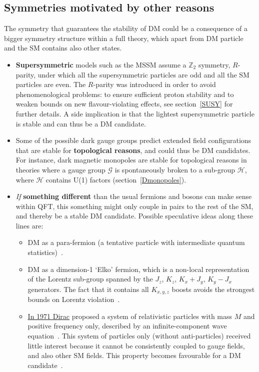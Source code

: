 \subsection{Symmetries motivated by other reasons} \label{sec:explicit:stabiilty}
The symmetry that guarantees the stability of DM could be a consequence of a bigger symmetry structure
within a full theory, which apart from DM particle and the SM contains also other states. 
 \begin{itemize}
 \item[$\blacktriangleright$] {\bf Supersymmetric} models such as the MSSM assume a  $\mathbb{Z}_2$  symmetry, $R$-parity,
 under which all the supersymmetric particles are odd and all the SM particles are even. The $R$-parity was introduced in order
 to avoid phenomenological problems: 
 to ensure sufficient proton stability and to weaken bounds on new flavour-violating effects,
 see section~\ref{SUSY} for further details. 
A side implication is that the lightest supersymmetric particle is stable and can thus be a DM candidate. 

 \item[$\blacktriangleright$] 
Some of the possible dark gauge groups predict extended field configurations that are stable for {\bf topological reasons}, 
and could thus be DM candidates. For instance, dark magnetic monopoles are stable for topological reasons in theories
where a gauge group $\mathcal{G}$ is spontaneously broken to a sub-group $\mathcal{H}$,  where
$\mathcal{H}$ contains U(1) factors (section~\ref{Dmonopoles}).


\item[$\blacktriangleright$] {\em If} {\bf something different} than the usual fermions and bosons can make sense within QFT, 
this something might only couple in pairs to the rest of the SM, and thereby be a stable DM candidate.
Possible speculative ideas along these lines are: 
\begin{itemize}
\item[$\rhd$] DM as a para-fermion (a tentative particle with intermediate quantum statistics)~\cite{1807.07289}.
\item[$\rhd$] DM as a dimension-1 `{Elko}' fermion, which is a non-local representation of the Lorentz sub-group spanned by the
$J_z$, $K_z$, $K_x+J_y$, $K_y-J_x$ generators. 
The fact that it contains all $K_{x,y,z}$ boosts avoids the strongest bounds on Lorentz violation~\cite{1008.0436}.

\item[$\rhd$] \href{https://doi.org/doi:10.1098/rspa.1971.0077}{In 1971 Dirac} proposed 
a system of relativistic particles with mass $M$ and positive frequency only, described by
an infinite-component wave equation~\cite{Dirac71}.
This system of particles only (without anti-particles) received little interest because it cannot be consistently coupled to gauge fields, and also other SM fields.
This property becomes favourable for a DM candidate~\cite{Dirac71}. 


\end{itemize}
\end{itemize}
